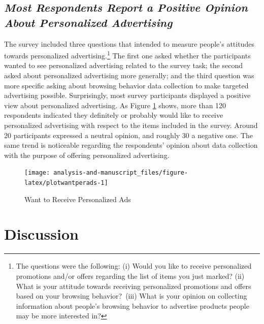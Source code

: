 \documentclass[
  11pt,
  letterpaper,
]{article}
\begin{document}
\hypertarget{most-respondents-report-a-positive-opinion-about-personalized-advertising}{%
\subsection{\texorpdfstring{\emph{Most Respondents Report a Positive Opinion About Personalized Advertising}}{Most Respondents Report a Positive Opinion About Personalized Advertising}}\label{most-respondents-report-a-positive-opinion-about-personalized-advertising}}

The survey included three questions that intended to measure people's attitudes towards personalized advertising.\footnote{The questions were the following: (i) Would you like to receive personalized promotions and/or offers regarding the list of items you just marked? (ii) What is your attitude towards receiving personalized promotions and offers based on your browsing behavior?~(iii) What is your opinion on collecting information about people's browsing behavior to advertise products people may be more interested in?} The first one asked whether the participants wanted to see personalized advertising related to the survey task; the second asked about personalized advertising more generally; and the third question was more specific asking about browsing behavior data collection to make targeted advertising possible. Surprisingly, most survey participants displayed a positive view about personalized advertising. As Figure \ref{fig:plotwantperads} shows, more than 120 respondents indicated they definitely or probably would like to receive personalized advertising with respect to the items included in the survey. Around 20 participants expressed a neutral opinion, and roughly 30 a negative one. The same trend is noticeable regarding the respondents' opinion about data collection with the purpose of offering personalized advertising.

\begin{figure}

{\centering \texttt{[image: analysis-and-manuscript\_files/figure-latex/plotwantperads-1]} 

}

\caption{Want to Receive Personalized Ads}\label{fig:plotwantperads}
\end{figure}

\hypertarget{discussion}{%
\section{Discussion}\label{discussion}}
\end{document}

